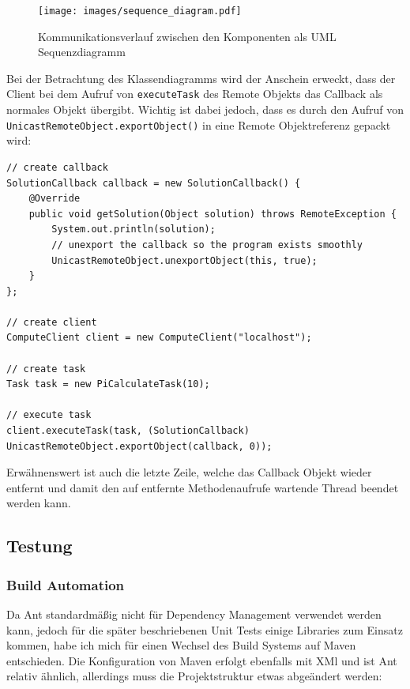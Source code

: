 \begin{figure}[H]
	\begin{center}
		\texttt{[image: images/sequence\_diagram.pdf]}
		\caption{Kommunikationsverlauf zwischen den Komponenten als UML Sequenzdiagramm}
		\label{broker}
	\end{center}
\end{figure}

Bei der Betrachtung des Klassendiagramms wird der Anschein erweckt, dass der Client bei dem Aufruf von \texttt{executeTask} des Remote Objekts das Callback als normales Objekt \"ubergibt.
Wichtig ist dabei jedoch, dass es durch den Aufruf von \texttt{UnicastRemoteObject.exportObject()} in eine Remote Objektreferenz gepackt wird:

\begin{lstlisting}[style=Java, caption=Beispielcode zur asynchronen Ausf\"uhrung einer Berechnung]
// create callback
SolutionCallback callback = new SolutionCallback() {
    @Override
    public void getSolution(Object solution) throws RemoteException {
        System.out.println(solution);
        // unexport the callback so the program exists smoothly
        UnicastRemoteObject.unexportObject(this, true);
    }
};

// create client
ComputeClient client = new ComputeClient("localhost");

// create task
Task task = new PiCalculateTask(10);

// execute task
client.executeTask(task, (SolutionCallback) UnicastRemoteObject.exportObject(callback, 0));
\end{lstlisting}

Erw\"ahnenswert ist auch die letzte Zeile, welche das Callback Objekt wieder entfernt und damit den auf entfernte Methodenaufrufe wartende Thread beendet werden kann.


\subsection{Testung}
\subsubsection{Build Automation}
Da Ant standardm\"a\ss ig nicht f\"ur Dependency Management verwendet werden kann, jedoch f\"ur die sp\"ater beschriebenen Unit Tests einige Libraries zum Einsatz kommen, habe ich mich f\"ur einen Wechsel des Build Systems auf Maven entschieden.
Die Konfiguration von Maven erfolgt ebenfalls mit XMl und ist Ant relativ \"ahnlich, allerdings muss die Projektstruktur etwas abge\"andert werden:

